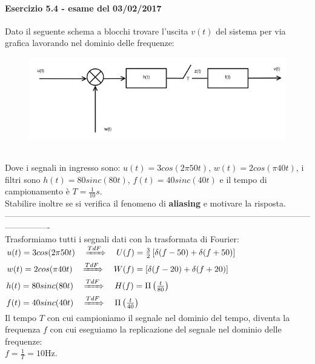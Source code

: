 \documentclass[12pt,a4paper]{article}
\begin{document}
	\paragraph{Esercizio 5.4 - esame del 03/02/2017} Dato il seguente schema a blocchi trovare l’uscita $v(t)$ del sistema per via grafica lavorando nel dominio delle frequenze:
	\begin{figure}[h!]
		\centering
		\includegraphics[scale=0.5]{./images/fourier54_1.png}
	\end{figure}
	\\Dove i segnali in ingresso sono: $u(t) = 3cos(2\pi 50t)$, $w(t) = 2cos(\pi 40t)$, i filtri sono $h(t) = 80sinc(80t)$, $f(t) = 40 sinc(40t)$ e il tempo di campionamento è $T = \frac{1}{10}s$.\\Stabilire inoltre se si verifica il fenomeno di \textbf{aliasing} e motivare la risposta.
	\vspace{5px}
	\\
	----------------------------------------------------------------------------------------------------------------------------\\
	Trasformiamo tutti i segnali dati con la trasformata di Fourier:\\
	$u(t) = 3cos(2\pi 50t)\quad\xRightarrow[]{TdF}\quad U(f) = \frac{3}{2}\left[\delta(f-50) + \delta(f+50)\right]$\\
	$w(t) = 2cos(\pi 40 t)\quad\xRightarrow[]{TdF}\quad W(f) = \left[\delta(f-20) + \delta(f+20)\right]$\\
	$h(t) = 80 sinc(80t)\quad\xRightarrow[]{TdF}\quad H(f) =
	\Pi\left(\frac{t}{80}\right)$\\$f(t) = 40 sinc(40t) \quad\xRightarrow[]{TdF}\quad  \Pi\left(\frac{t}{40}\right)$\vspace{5px}\\
	Il tempo $T$ con cui campioniamo il segnale nel dominio del tempo, diventa la frequenza $f$ con cui eseguiamo la replicazione del segnale nel dominio delle frequenze:\\$f = \frac{1}{T} = 10$Hz.\\ \\
\end{document}
